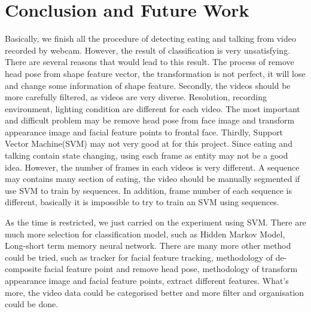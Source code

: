 \chapter{Conclusion and Future Work}
Basically, we finish all the procedure of detecting eating and talking from video recorded by webcam. However, the result of classification is very unsatisfying. There are several reasons that would lead to this result. The process of remove head pose from shape feature vector, the transformation is not perfect, it will lose and change some information of shape feature. Secondly, the videos should be more carefully filtered, as videos are very diverse. Resolution, recording environment, lighting condition are different for each video. The most important and difficult problem may be remove head pose from face image and transform appearance image and facial feature points to frontal face. Thirdly, Support Vector Machine(SVM) may not very good at for this project. Since eating and talking contain state changing, using each frame as entity may not be a good idea. However, the number of frames in each videos is very different. A sequence may contains many section of eating, the video should be manually segmented if use SVM to train by sequences. In addition, frame number of each sequence is different, basically it is impossible to try to train an SVM using sequences.

As the time is restricted, we just carried on the experiment using SVM. There are much more selection for classification model, such as Hidden Markov Model, Long-short term memory neural network. There are many more other method could be tried, such as tracker for facial feature tracking, methodology of de-composite facial feature point and remove head pose, methodology of transform appearance image and facial feature points, extract different features. What's more, the video data could be categorised better and more filter and organisation could be done.


